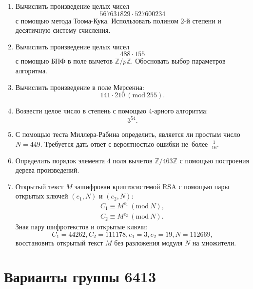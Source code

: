 \documentclass[14pt]{extarticle}
\begin{document}
	\begin{enumerate}
		\item Вычислить произведение целых чисел \[567631829 \cdot 527600234\] с помощью метода Тоома-Кука. Использовать полином 2-й степени и десятичную систему счисления.
		\item Вычислить произведение целых чисел \[488 \cdot 155\] с помощью БПФ в поле вычетов $\mathbb{Z}/p\mathbb{Z}$. Обосновать выбор параметров алгоритма.
		\item Вычислить произведение в поле Мерсенна: \[141 \cdot 210\ (\textrm{mod}\ 255).\]
		\item Возвести целое число в степень с помощью $4$-арного алгоритма: \[3^{54}.\]
		\item С помощью теста Миллера-Рабина определить, является ли простым число $N = 449$. Требуется дать ответ с вероятностью ошибки не~более~$\frac{1}{16}$.
		\item Определить порядок элемента $4$ поля вычетов $\mathbb{Z}/463\mathbb{Z}$ с помощью построения дерева произведений.
		\item Открытый текст $M$ зашифрован криптосистемой RSA с помощью пары открытых ключей $(e_1, N)$ и $(e_2, N)$:  \[\begin{aligned} C_1 \equiv M^{e_1}\ (\textrm{mod}\ N), \\ C_2 \equiv M^{e_2}\ (\textrm{mod}\ N). \end{aligned}\] Зная пару шифротекстов и открытые ключи: \[C_1 = 44262, C_2 = 111178, e_1 = 3, e_2 = 19, N = 112669,\] восстановить открытый текст $M$ без разложения модуля $N$ на множители.
	\end{enumerate}
\clearpage
	\section{Варианты группы 6413}
\end{document}

